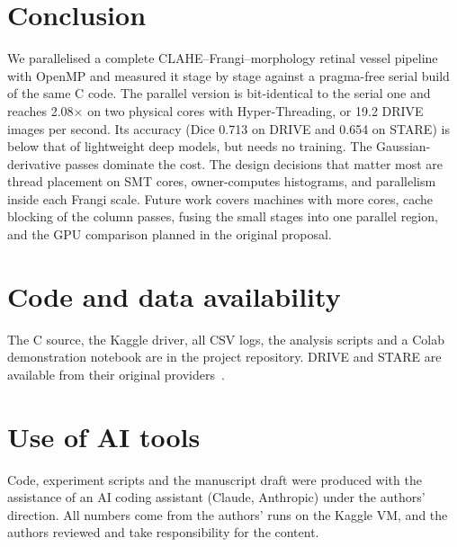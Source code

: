 \section{Conclusion}\label{sec:conclusion}
We parallelised a complete CLAHE--Frangi--morphology retinal vessel pipeline with OpenMP and measured it stage by
stage against a pragma-free serial build of the same C code. The parallel version is bit-identical to the
serial one and reaches 2.08$\times$ on two physical cores with Hyper-Threading, or 19.2 DRIVE images per second.
Its accuracy (Dice 0.713 on DRIVE and 0.654 on STARE) is below that of lightweight deep models, but needs no
training. The Gaussian-derivative passes dominate the cost. The design decisions that matter most are thread
placement on SMT cores, owner-computes histograms, and parallelism inside each Frangi scale. Future work covers
machines with more cores, cache blocking of the column passes, fusing the small stages into one parallel
region, and the GPU comparison planned in the original proposal.

\section*{Code and data availability}
The C source, the Kaggle driver, all CSV logs, the analysis scripts and a Colab demonstration notebook are in
the project repository. DRIVE and STARE are available from their original providers~\cite{staal2004,hoover2000}.

\section*{Use of AI tools}
Code, experiment scripts and the manuscript draft were produced with the assistance of an AI coding assistant
(Claude, Anthropic) under the authors' direction. All numbers come from the authors' runs on the Kaggle VM, and
the authors reviewed and take responsibility for the content.
